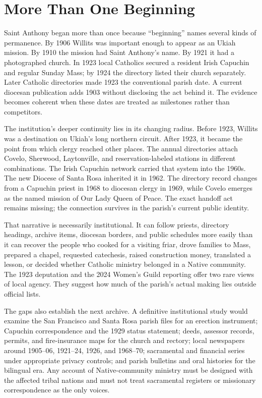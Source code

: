 \section{More Than One Beginning}

Saint Anthony began more than once because ``beginning'' names several kinds of permanence. By 1906 Willits was important enough to appear as an Ukiah mission. By 1910 the mission had Saint Anthony's name. By 1921 it had a photographed church. In 1923 local Catholics secured a resident Irish Capuchin and regular Sunday Mass; by 1924 the directory listed their church separately. Later Catholic directories made 1923 the conventional parish date. A current diocesan publication adds 1903 without disclosing the act behind it. The evidence becomes coherent when these dates are treated as milestones rather than competitors.

The institution's deeper continuity lies in its changing radius. Before 1923, Willits was a destination on Ukiah's long northern circuit. After 1923, it became the point from which clergy reached other places. The annual directories attach Covelo, Sherwood, Laytonville, and reservation-labeled stations in different combinations. The Irish Capuchin network carried that system into the 1960s. The new Diocese of Santa Rosa inherited it in 1962. The directory record changes from a Capuchin priest in 1968 to diocesan clergy in 1969, while Covelo emerges as the named mission of Our Lady Queen of Peace. The exact handoff act remains missing; the connection survives in the parish's current public identity.

That narrative is necessarily institutional. It can follow priests, directory headings, archive items, diocesan borders, and public schedules more easily than it can recover the people who cooked for a visiting friar, drove families to Mass, prepared a chapel, requested catechesis, raised construction money, translated a lesson, or decided whether Catholic ministry belonged in a Native community. The 1923 deputation and the 2024 Women's Guild reporting offer two rare views of local agency. They suggest how much of the parish's actual making lies outside official lists.

The gaps also establish the next archive. A definitive institutional study would examine the San Francisco and Santa Rosa parish files for an erection instrument; Capuchin correspondence and the 1929 status statement; deeds, assessor records, permits, and fire-insurance maps for the church and rectory; local newspapers around 1905--06, 1921--24, 1926, and 1968--70; sacramental and financial series under appropriate privacy controls; and parish bulletins and oral histories for the bilingual era. Any account of Native-community ministry must be designed with the affected tribal nations and must not treat sacramental registers or missionary correspondence as the only voices.

